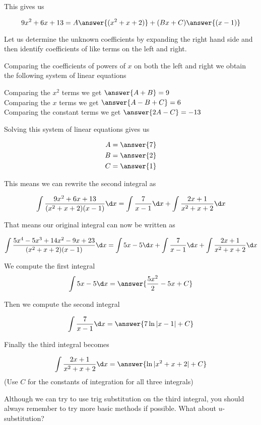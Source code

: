 \documentclass{ximera}
\begin{document}
\begin{exercise}
\begin{exercise}
\begin{exercise}
This gives us 

\[
9x^{2}+6x+13=A\answer{(x^{2}+x+2)} + (Bx+C)\answer{(x-1)}
\]

Let us determine the unknown coefficients by expanding the right hand side and then identify coefficients of like terms on the left and right.



Comparing the coefficients of powers of $x$ on both the left and right we obtain the following system of linear equations


Comparing the $x^{2}$ terms we get $\answer {A+B}=9$ \\
Comparing the $x$ terms we get $\answer{A-B+C}=6$ \\
Comparing the constant terms we get $\answer{2A-C}=-13$ 

\begin{exercise}
Solving this system of linear equations gives us

\begin{align}
A&=\answer{ 7 }\\
B&=\answer{2  }\\
C&=\answer{ 1 }
\end{align}





\begin{exercise}
This means we can  rewrite the second integral as

\[
\int \frac{9x^{2}+6x+13}{(x^{2}+x+2)(x-1)} \d x= \int \frac{7}{x-1} \d x + \int \frac{2x+1}{x^{2}+x+2} \d x
\]

 That means our original integral can now be written as 

\[
\int \frac{5x^{4}-5x^{3}+14x^{2}-9x+23}{(x^{2}+x+2)(x-1)} \d x= \int 5x-5 \d x + \int \frac{7}{x-1} \d x +
\int \frac{2x+1}{x^{2}+x+2} \d x 
\]

We compute the first integral 
\[
\int 5x-5 \d x =\answer{ \frac{5x^{2}}{2} - 5x +C }
\]

Then we compute the second integral 

\[
\int \frac{7}{x-1} \d x= \answer{ 7\ln|x-1|+C }
\]

Finally the third integral becomes 

\[
\int \frac{2x+1}{x^{2}+x+2} \d x=\answer{ \ln| x^{2}+x+2 | + C}
\]
(Use $C$ for the constants of integration for all three integrals)

\begin{hint}
Although we can try to use trig substitution on the third integral, you should always remember to try more basic
methods if possible. What about $u$-substitution?
\end{hint}


\end{exercise}
\end{exercise}
\end{exercise}
\end{exercise}
\end{exercise}
\end{document}
